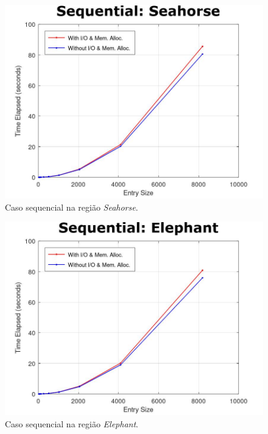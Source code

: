 \documentclass[a4paper, 12pt]{article}
\begin{document}
\begin{figure}[H]
	\centering
	\includegraphics[scale=0.45]{seq_seahorse}
	\caption{Caso sequencial na região \textit{Seahorse}.}
\end{figure}

\begin{figure}[H]
	\centering
	\includegraphics[scale=0.45]{seq_elephant}
	\caption{Caso sequencial na região \textit{Elephant}.}
\end{figure}
\end{document}
